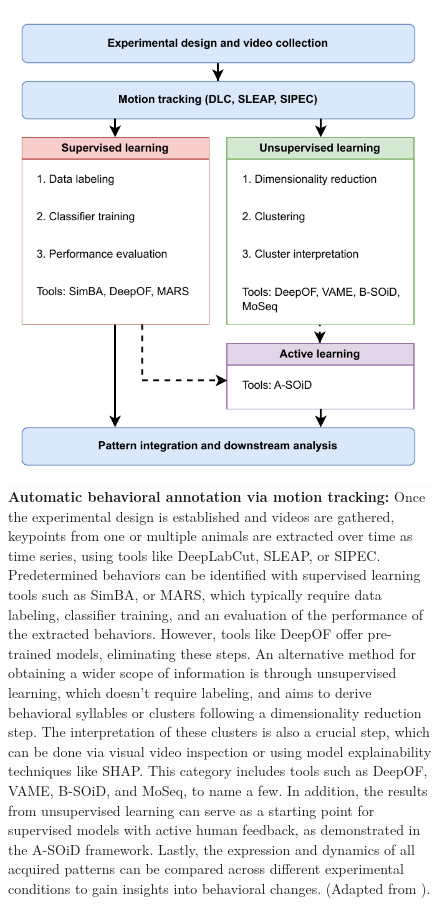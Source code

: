 \begin{figure}[H]
\centering
\includegraphics[width=(\textwidth - 85pt)]{Figures/intro_5.pdf}

\caption[\textbf{Automatic behavioral annotation via motion tracking:} exploring different annotation options]{\textbf{Automatic behavioral annotation via motion tracking:} Once the experimental design is established and videos are gathered, keypoints from one or multiple animals are extracted over time as time series, using tools like DeepLabCut, SLEAP, or SIPEC. Predetermined behaviors can be identified with supervised learning tools such as SimBA, or MARS, which typically require data labeling, classifier training, and an evaluation of the performance of the extracted behaviors. However, tools like DeepOF offer pre-trained models, eliminating these steps. An alternative method for obtaining a wider scope of information is through unsupervised learning, which doesn't require labeling, and aims to derive behavioral syllables or clusters following a dimensionality reduction step. The interpretation of these clusters is also a crucial step, which can be done via visual video inspection or using model explainability techniques like SHAP. This category includes tools such as DeepOF, VAME, B-SOiD, and MoSeq, to name a few. In addition, the results from unsupervised learning can serve as a starting point for supervised models with active human feedback, as demonstrated in the A-SOiD framework. Lastly, the expression and dynamics of all acquired patterns can be compared across different experimental conditions to gain insights into behavioral changes. (Adapted from \cite{Bordes2023AdvancingLearning}).}
\label{fig:1.5}

\end{figure}

